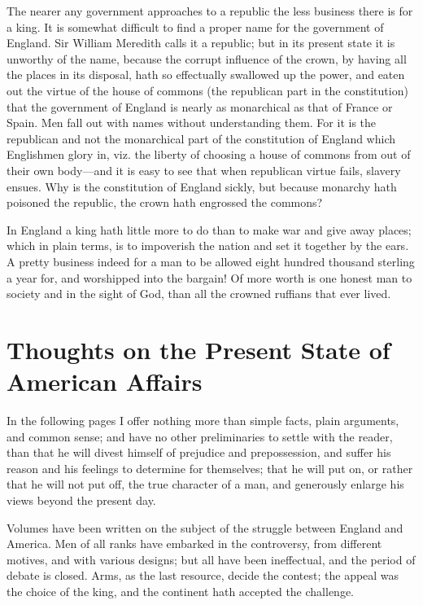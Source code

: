 \documentclass[12pt,oneside]{memoir}
\begin{document}
The nearer any government approaches to a republic the less business
there is for a king. It is somewhat difficult to find a proper name
for the government of England. Sir William Meredith calls it a
republic; but in its present state it is unworthy of the name,
because the corrupt influence of the crown, by having all the places
in its disposal, hath so effectually swallowed up the power, and
eaten out the virtue of the house of commons (the republican part in
the constitution) that the government of England is nearly as
monarchical as that of France or Spain. Men fall out with names
without understanding them. For it is the republican and not the
monarchical part of the constitution of England which Englishmen
glory in, viz. the liberty of choosing a house of commons from out
of their own body---and it is easy to see that when republican virtue
fails, slavery ensues. Why is the constitution of England sickly,
but because monarchy hath poisoned the republic, the crown hath
engrossed the commons?

In England a king hath little more to do than to make war and give
away places; which in plain terms, is to impoverish the nation and
set it together by the ears. A pretty business indeed for a man to
be allowed eight hundred thousand sterling a year for, and
worshipped into the bargain! Of more worth is one honest man to
society and in the sight of God, than all the crowned ruffians that
ever lived.

\section*{Thoughts on the Present State of American Affairs}

In the following pages I offer nothing more than simple facts, plain
arguments, and common sense; and have no other preliminaries to
settle with the reader, than that he will divest himself of
prejudice and prepossession, and suffer his reason and his feelings
to determine for themselves; that he will put on, or rather that he
will not put off, the true character of a man, and generously
enlarge his views beyond the present day.

Volumes have been written on the subject of the struggle between
England and America. Men of all ranks have embarked in the
controversy, from different motives, and with various designs; but
all have been ineffectual, and the period of debate is closed. Arms,
as the last resource, decide the contest; the appeal was the choice
of the king, and the continent hath accepted the challenge.
\end{document}
